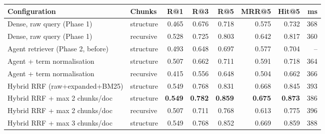\begin{tabular}{@{}llrrrrrr@{}}
\toprule
Configuration & Chunks & R@1 & R@3 & R@5 & MRR@5 & Hit@5 & ms \\
\midrule
Dense, raw query (Phase 1) & structure & 0.465 & 0.676 & 0.718 & 0.575 & 0.732 & 368 \\
Dense, raw query (Phase 1) & recursive & 0.528 & 0.725 & 0.803 & 0.642 & 0.817 & 360 \\
Agent retriever (Phase 2, before) & structure & 0.493 & 0.648 & 0.697 & 0.577 & 0.704 & -- \\
Agent + term normalisation & structure & 0.507 & 0.662 & 0.711 & 0.591 & 0.718 & 364 \\
Agent + term normalisation & recursive & 0.415 & 0.556 & 0.648 & 0.504 & 0.662 & 366 \\
Hybrid RRF (raw+expanded+BM25) & structure & 0.549 & 0.768 & 0.831 & 0.668 & 0.845 & 393 \\
Hybrid RRF + max 2 chunks/doc & structure & \textbf{0.549} & \textbf{0.782} & \textbf{0.859} & \textbf{0.675} & \textbf{0.873} & 386 \\
Hybrid RRF + max 2 chunks/doc & recursive & 0.507 & 0.711 & 0.768 & 0.613 & 0.775 & 396 \\
Hybrid RRF + max 3 chunks/doc & structure & 0.549 & 0.768 & 0.852 & 0.669 & 0.859 & 388 \\
\bottomrule
\end{tabular}